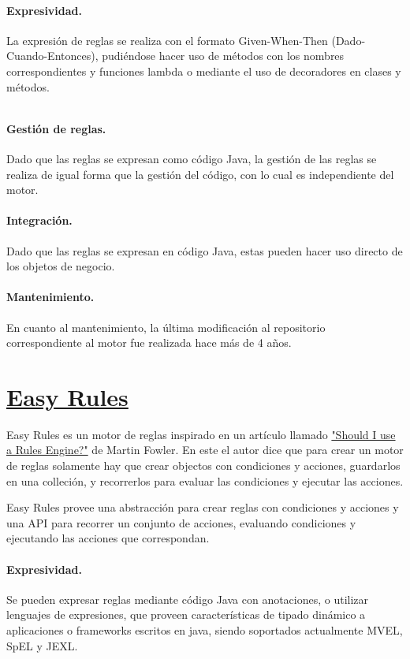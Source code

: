 \paragraph{Expresividad.}
La expresión de reglas se realiza con el formato Given-When-Then (Dado-Cuando-Entonces), pudiéndose hacer uso de métodos con los nombres correspondientes y funciones lambda o mediante el uso de decoradores en clases y métodos.

\inputminted{java}{code/Rulebook.java}

\paragraph{Gestión de reglas.}
Dado que las reglas se expresan como código Java, la gestión de las reglas se realiza de igual forma que la gestión del código, con lo cual es independiente del motor.

\paragraph{Integración.}
Dado que las reglas se expresan en código Java, estas pueden hacer uso directo de los objetos de negocio.

\paragraph{Mantenimiento.}
En cuanto al mantenimiento, la última modificación al repositorio correspondiente al motor fue realizada hace más de 4 años.

\section{\href{https://github.com/j-easy/easy-rules}{Easy Rules}}
Easy Rules es un motor de reglas inspirado en un artículo llamado \href{https://martinfowler.com/bliki/RulesEngine.html}{"Should I use a Rules Engine?"} de Martin Fowler. En este el autor dice que para crear un motor de reglas solamente hay que crear objectos con condiciones y acciones, guardarlos en una colleción, y recorrerlos para evaluar las condiciones y ejecutar las acciones.

Easy Rules provee una abstracción para crear reglas con condiciones y acciones y una API para recorrer un conjunto de acciones, evaluando condiciones y ejecutando las acciones que correspondan.

\paragraph{Expresividad.}
Se pueden expresar reglas mediante código Java con anotaciones, o utilizar lenguajes de expresiones, que proveen características de tipado dinámico a aplicaciones o frameworks escritos en java, siendo soportados actualmente MVEL, SpEL y JEXL.

